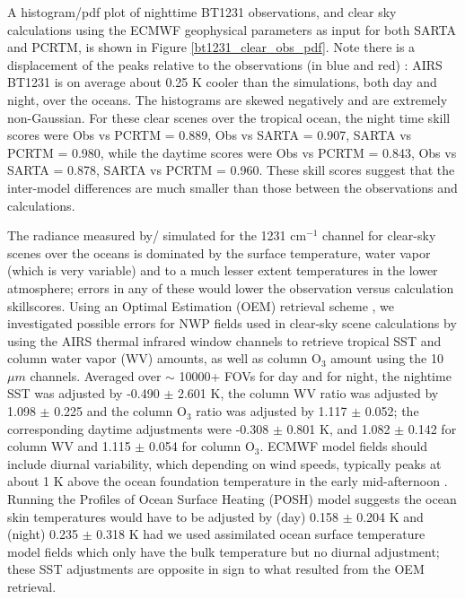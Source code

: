 \documentclass[agupp]{aguplus}              %
\newcommand{\wn}{cm$^{-1}$\xspace}
\newcommand{\um}{$\mu m$\xspace}
\newcommand{\ozone}{O$_3$\xspace}
\begin{document}
\begin{article}
A histogram/pdf plot of nighttime BT1231 observations, and clear sky
calculations using the ECMWF geophysical parameters as input for both
SARTA and PCRTM, is shown in Figure \ref{bt1231_clear_obs_pdf}. Note
there is a displacement of the peaks relative to the observations (in
blue and red) : AIRS BT1231 is on average about 0.25 K cooler than the
simulations, both day and night, over the oceans. The histograms are
skewed negatively and are extremely non-Gaussian. For these clear
scenes over the tropical ocean, the night time skill scores were Obs
vs PCRTM = 0.889, Obs vs SARTA = 0.907, SARTA vs PCRTM = 0.980, while
the daytime scores were Obs vs PCRTM = 0.843, Obs vs SARTA = 0.878,
SARTA vs PCRTM = 0.960. These skill scores suggest that the
inter-model differences are much smaller than those between the
observations and calculations.


The radiance measured by/ simulated for the 1231 \wn channel for
clear-sky scenes over the oceans is dominated by the surface
temperature, water vapor (which is very variable) and to a much lesser
extent temperatures in the lower atmosphere; errors in any of these
would lower the observation versus calculation skillscores.  Using an
Optimal Estimation (OEM) retrieval scheme \citep{rod:00}, we
investigated possible errors for NWP fields used in clear-sky scene
calculations by using the AIRS thermal infrared window channels to
retrieve tropical SST and column water vapor (WV) amounts, as well as column
\ozone amount using the 10\um channels. Averaged over $\sim$
10000+ FOVs for day and for night, the nightime SST was adjusted by
-0.490 $\pm$ 2.601 K, the column WV ratio was adjusted by 1.098 $\pm$
0.225 and the column \ozone ratio was adjusted by 1.117 $\pm$ 0.052; the
corresponding daytime adjustments were -0.308 $\pm$ 0.801 K, and 1.082
$\pm$ 0.142 for column WV and 1.115 $\pm$ 0.054 for column \ozone. ECMWF model
fields should include diurnal variability, which depending on wind
speeds, typically peaks at about 1 K above the ocean foundation
temperature in the early mid-afternoon \citep{gen:09}. Running the
Profiles of Ocean Surface Heating (POSH) model \citep{gen:09} suggests
the ocean skin temperatures would have to be adjusted by (day) 0.158
$\pm$ 0.204 K and (night) 0.235 $\pm$ 0.318 K had we used assimilated
ocean surface temperature model fields which only have the bulk
temperature but no diurnal adjustment; these SST adjustments are
opposite in sign to what resulted from the OEM retrieval.


\end{article}
\end{document}
